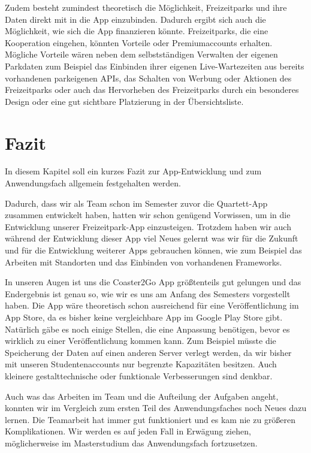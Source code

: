 Zudem besteht zumindest theoretisch die Möglichkeit, Freizeitparks und ihre Daten direkt mit in die App einzubinden. Dadurch ergibt sich auch die Möglichkeit, wie sich die App finanzieren könnte. Freizeitparks, die eine Kooperation eingehen, könnten Vorteile oder Premiumaccounts erhalten. Mögliche Vorteile wären neben dem selbstständigen Verwalten der eigenen Parkdaten zum Beispiel das Einbinden ihrer eigenen Live-Wartezeiten aus bereits vorhandenen parkeigenen APIs, das Schalten von Werbung oder Aktionen des Freizeitparks oder auch das Hervorheben des Freizeitparks durch ein besonderes Design oder eine gut sichtbare Platzierung in der Übersichtsliste. 

\chapter{Fazit}
\label{cha:Fazit}

In diesem Kapitel soll ein kurzes Fazit zur App-Entwicklung und zum Anwendungsfach allgemein festgehalten werden.

Dadurch, dass wir als Team schon im Semester zuvor die Quartett-App zusammen entwickelt haben, hatten wir schon genügend Vorwissen, um in die Entwicklung unserer Freizeitpark-App einzusteigen. Trotzdem haben wir auch während der Entwicklung dieser App viel Neues gelernt was wir für die Zukunft und für die Entwicklung weiterer Apps gebrauchen können, wie zum Beispiel das Arbeiten mit Standorten und das Einbinden von vorhandenen Frameworks.

In unseren Augen ist uns die Coaster2Go App größtenteils gut gelungen und das Endergebnis ist genau so, wie wir es uns am Anfang des Semesters vorgestellt haben. Die App wäre theoretisch schon ausreichend für eine Veröffentlichung im App Store, da es bisher keine vergleichbare App im Google Play Store gibt. Natürlich gäbe es noch einige Stellen, die eine Anpassung benötigen, bevor es wirklich zu einer Veröffentlichung kommen kann. Zum Beispiel müsste die Speicherung der Daten auf einen anderen Server verlegt werden, da wir bisher mit unseren Studentenaccounts nur begrenzte Kapazitäten besitzen. Auch kleinere gestalttechnische oder funktionale Verbesserungen sind denkbar. 

Auch was das Arbeiten im Team und die Aufteilung der Aufgaben angeht, konnten wir im Vergleich zum ersten Teil des Anwendungsfaches noch Neues dazu lernen. Die Teamarbeit hat immer gut funktioniert und es kam nie zu größeren Komplikationen. Wir werden es auf jeden Fall in Erwägung ziehen, möglicherweise im Masterstudium das Anwendungsfach fortzusetzen.
